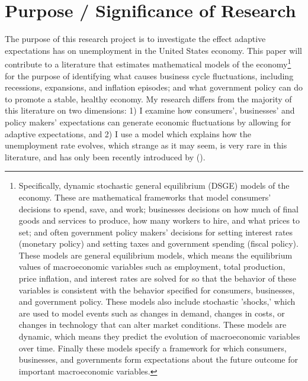 \documentclass[11pt]{article}
\newcommand{\citee}[1]{\citename{#1} (\citeyear{#1})}
\begin{document}
\section{Purpose / Significance of Research}
The purpose of this research project is to investigate the effect adaptive expectations has on unemployment in the United States economy.  This paper will contribute to a literature that estimates mathematical models of the economy\footnote{Specifically, dynamic stochastic general equilibrium (DSGE) models of the economy.  These are mathematical frameworks that model consumers' decisions to spend, save, and work; businesses decisions on how much of final goods and services to produce, how many workers to hire, and what prices to set; and often government policy makers' decisions for setting interest rates (monetary policy) and setting taxes and government spending (fiscal policy).  These models are general equilibrium models, which means the equilibrium values of macroeconomic variables such as employment, total production, price inflation, and interest rates are solved for so that the behavior of these variables is consistent with the behavior specified for consumers, businesses, and government policy.  These models also include stochastic 'shocks,' which are used to model events such as changes in demand, changes in costs, or changes in technology that can alter market conditions.  These models are dynamic, which means they predict the evolution of macroeconomic variables over time.  Finally these models specify a framework for which consumers, businesses, and governments form expectations about the future outcome for important macroeconomic variables.} for the purpose of identifying what causes business cycle fluctuations, including recessions, expansions, and inflation episodes; and what government policy can do to promote a stable, healthy economy.  My research differs from the majority of this literature on two dimensions: 1) I examine how consumers', businesses' and policy makers' expectations can generate economic fluctuations by allowing for adaptive expectations, and 2) I use a model which explains how the unemployment rate evolves, which strange as it may seem, is very rare in this literature, and has only been recently introduced by \citee{blanchard_gali2010}.
\end{document}
